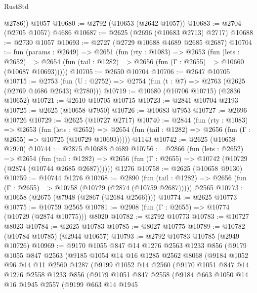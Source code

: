 \begin{lexlean}{RustStd}
\begin{coremodule}
        @2786))
    @1057
@10680 := @2792 (@10653 (@2642 @1057))
@10683 := @2704 (@2705 @1057) @4686
@10687 := @2625 (@2696 (@10683 @2713) @2717)
@10688 := @2730 @1057
@10693 := @2727 (@2729 @10688 @4689 @2685 @2687)
@10704 := fun (params : @2649) =>
  @2651
    (fun (rty : @1083) =>
    @2653
      (fun (lets : @2652) =>
      @2654 (fun (tail : @1282) => @2656 (fun (Γ : @2655) => @10660 (@10687 @10693)))))
@10705 := @2650 @10704
@10706 := @2647 @10705
@10715 := @2753 (fun (U : @2752) => @2754 (fun (t : @7) => @2763 (@2625 (@2769 @4686 @2643) @2780)))
@10719 := @10680 (@10706 @10715) (@2836 @10652)
@10721 := @2610 @10705 @10715
@10723 := @2841 @10704 @2193
@10725 := @2625 (@10658 @7950)
@10726 := @10683 @7953
@10727 := @2696 @10726
@10729 := @2625 (@10727 @2717)
@10740 := @2844
    (fun (rty : @1083) =>
    @2653
      (fun (lets : @2652) =>
      @2654 (fun (tail : @1282) => @2656 (fun (Γ : @2655) => @10725 (@10729 @10693)))))
    @1143
@10742 := @2625 (@10658 @7970)
@10744 := @2875 @10688 @4689
@10756 := @2866
    (fun (lets : @2652) =>
    @2654
      (fun (tail : @1282) =>
      @2656 (fun (Γ : @2655) => @10742 (@10729 (@2874 (@10744 @2685 @2687))))))
    @1276
@10758 := @2625 (@10658 @9130)
@10759 := @10744 @1276
@10768 := @2890
    (fun (tail : @1282) => @2656 (fun (Γ : @2655) => @10758 (@10729 (@2874 (@10759 @2687)))))
    @2565
@10773 := @10658 (@2675 (@7948 (@2867 (@2684 @2566))))
@10774 := @2625 @10773
@10775 := @10759 @2565
@10781 := @2908 (fun (Γ : @2655) => @10774 (@10729 (@2874 @10775))) @8020
@10782 := @2792 @10773
@10783 := @10727 @8023
@10784 := @2625 @10783
@10785 := @8027 @10775
@10789 := @10782 (@10784 @10785) (@2944 @10657)
@10793 := @2792 @10783 @10785 (@2949 @10726)
@10969 := @9170
    @1055
    @847
    @14
    @1276
    @2563
    @1233
    @856
    (@9179
      @1055
      @847
      @2563
      (@9185
        @1054
        @14
        @16
        @1285
        @2562
        @8068
        (@9184
          @1052
          @96
          @14
          @11
          @2560
          @1287
          (@9199
            @1052
            @14
            @2560
            (@9170
              @1051
              @847
              @14
              @1276
              @2558
              @1233
              @856
              (@9179
                @1051
                @847
                @2558
                (@9184
                  @663
                  @1050
                  @14
                  @16
                  @1945
                  @2557
                  (@9199
                    @663
                    @14
                    @1945

\end{coremodule}
\end{lexlean}
